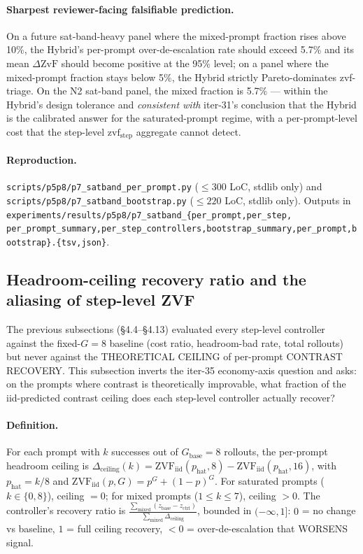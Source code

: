 \documentclass{article}
\begin{document}
\paragraph{Sharpest reviewer-facing falsifiable prediction.}
On a future sat-band-heavy panel where the mixed-prompt fraction
rises above 10\%, the Hybrid's per-prompt over-de-escalation rate
should exceed 5.7\% and its mean $\Delta\mathrm{ZvF}$ should become
positive at the 95\% level; on a panel where the mixed-prompt fraction
stays below 5\%, the Hybrid strictly Pareto-dominates zvf-triage.
On the N2 sat-band panel, the mixed fraction is 5.7\% --- within the
Hybrid's design tolerance and \emph{consistent with} iter-31's
conclusion that the Hybrid is the calibrated answer for the
saturated-prompt regime, with a per-prompt-level cost that the
step-level $\mathrm{zvf}_\text{step}$ aggregate cannot detect.

\paragraph{Reproduction.}
\texttt{scripts/p5p8/p7\_satband\_per\_prompt.py}
($\leq 300$ LoC, stdlib only) and
\texttt{scripts/p5p8/p7\_satband\_bootstrap.py}
($\leq 220$ LoC, stdlib only). Outputs in
\texttt{experiments/results/p5p8/p7\_satband\_\{per\_prompt,per\_step,
per\_prompt\_summary,per\_step\_controllers,bootstrap\_summary,per\_prompt,bootstrap\}.\{tsv,json\}}.

\subsection{Headroom-ceiling recovery ratio and the aliasing of step-level ZVF}
\label{sec:p7-headroom-recovery}

The previous subsections (§4.4--§4.13) evaluated every step-level
controller against the fixed-$G{=}8$ baseline (cost ratio,
headroom-bad rate, total rollouts) but never against the THEORETICAL
CEILING of per-prompt CONTRAST RECOVERY. This subsection inverts the
iter-35 economy-axis question and asks: on the prompts where contrast
is theoretically improvable, what fraction of the iid-predicted
contrast ceiling does each step-level controller actually recover?

\paragraph{Definition.} For each prompt with $k$ successes out of
$G_{\mathrm{base}}{=}8$ rollouts, the per-prompt headroom ceiling is
$\Delta_{\mathrm{ceiling}}(k) = \mathrm{ZVF}_{\mathrm{iid}}(p_{\mathrm{hat}}, 8)
- \mathrm{ZVF}_{\mathrm{iid}}(p_{\mathrm{hat}}, 16)$, with
$p_{\mathrm{hat}}{=}k/8$ and
$\mathrm{ZVF}_{\mathrm{iid}}(p, G) = p^G + (1-p)^G$. For saturated
prompts ($k \in \{0, 8\}$), ceiling $= 0$; for mixed prompts
($1 \le k \le 7$), ceiling $> 0$. The controller's recovery ratio is
$\frac{\sum_{\mathrm{mixed}}(z_{\mathrm{base}} - z_{\mathrm{ctrl}})}{\sum_{\mathrm{mixed}}\Delta_{\mathrm{ceiling}}}$,
bounded in $(-\infty, 1]$: $0$ = no change vs baseline, $1$ = full
ceiling recovery, $< 0$ = over-de-escalation that WORSENS signal.
\end{document}
